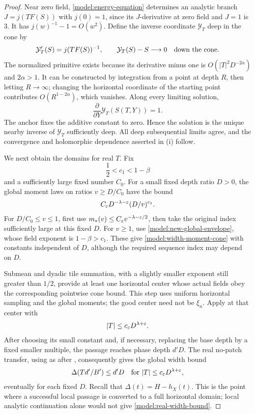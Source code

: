 \begin{proof}
Near zero field, \eqref{model:energy-equation} determines an
analytic branch \(J=j(TF(S))\) with \(j(0)=1\), since its
\(J\)-derivative at zero field and \(J=1\) is \(3\).
It has \(j(w)^{-1}-1=O(w^2)\).  Define the inverse coordinate
\(\mathcal Y_T\) deep in the cone by
\[
 \mathcal Y_T'(S)=j(TF(S))^{-1},\qquad
 \mathcal Y_T(S)-S\longrightarrow0
       \quad\hbox{down the cone}.
\]
The normalized primitive exists because its derivative minus one
is \(O(|T|^2D^{-2\alpha})\) and \(2\alpha>1\).  It can be
constructed by integration from a point at depth \(R\), then
letting \(R\to\infty\); changing the horizontal coordinate of the
starting point contributes \(O(R^{1-2\alpha})\), which vanishes.
Along every limiting solution,
\[
 \frac{\partial}{\partial Y}\mathcal Y_T(S(T,Y))=1.
\]
The anchor fixes the additive constant to zero.  Hence the solution
is the unique nearby inverse of \(\mathcal Y_T\) sufficiently deep.
All deep subsequential limits agree, and the convergence and
holomorphic dependence asserted in \textup{(i)} follow.

We next obtain the domains for real \(T\).  Fix
\[
 \frac12<c_1<1-\beta
\]
and a sufficiently large fixed number \(C_0\).  For a small fixed
depth ratio \(D>0\), the global moment laws on ratios
\(v\ge D/C_0\) have the bound
\begin{equation}
\label{model:width-moment-cone}
 C_\varepsilon D^{-\lambda-\varepsilon}(D/v)^{c_1}.
\end{equation}
For \(D/C_0\le v\le1\), first use
\(m_*(v)\le C_\varepsilon v^{-\lambda-\varepsilon/2}\), then take the original
index sufficiently large at this fixed \(D\).
For \(v\ge1\), use
\eqref{model:new-global-envelope}, whose field exponent is
\(1-\beta>c_1\).  These give \eqref{model:width-moment-cone}
with constants independent of \(D\), although the required
sequence index may depend on \(D\).

Submean and dyadic tile summation, with a slightly smaller exponent
still greater than \(1/2\), provide at least one horizontal center
whose actual fields obey the corresponding pointwise cone bound.
This step uses uniform horizontal sampling and the global moments;
the good center need not be \(\xi_n\).  Apply 
at that center with
\[
 |T|\le c_\varepsilon D^{\lambda+\varepsilon}.
\]
After choosing its small constant and, if necessary, replacing the
base depth by a fixed smaller multiple, the passage reaches phase
depth \(d'D\).  The real no-patch transfer, using
 as after , consequently gives
the global width bound
\begin{equation}
\label{model:real-width-bound}
 \Delta(Td'/B')\le d'D
 \quad\hbox{for }|T|\le c_\varepsilon D^{\lambda+\varepsilon},
\end{equation}
eventually for each fixed \(D\).  Recall that
\(\Delta(t)=H-h_X(t)\).
This is the point where a successful local passage is converted
to a full horizontal domain; local analytic continuation alone
would not give \eqref{model:real-width-bound}.


\end{proof}
